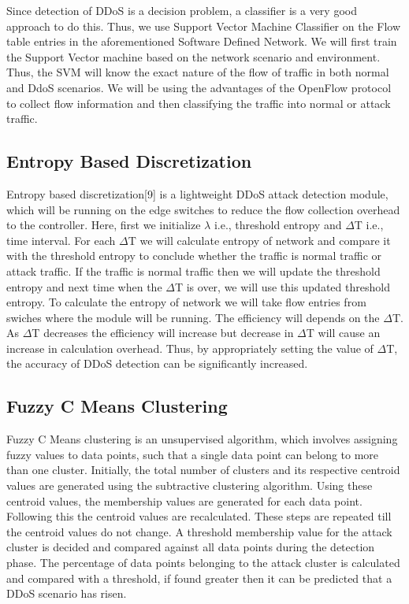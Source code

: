 \documentclass[12pt,a4paper,final]{report}
\begin{document}
Since detection of DDoS is a decision problem, a classifier is a very good approach to do this. Thus, we use Support Vector Machine Classifier on the Flow table entries in the aforementioned Software Defined Network. We will first train the Support Vector machine based on the network scenario and environment. Thus, the SVM will know the exact nature of the flow of traffic in both normal and DdoS scenarios. We will be using the advantages of the OpenFlow protocol to collect flow information and then classifying the traffic into normal or attack traffic.

\subsection{Entropy Based Discretization}
Entropy based discretization[9] is a lightweight DDoS attack detection module, which will be running on the edge switches to reduce the flow collection overhead to the controller. Here, first we initialize $\lambda$ i.e., threshold entropy and $\Delta$T i.e., time interval. For each $\Delta$T we will calculate entropy of network and compare it with the threshold entropy to conclude whether the traffic is normal traffic or attack traffic. If the traffic is normal traffic then we will update the threshold entropy and next time when the $\Delta$T is over, we will use this updated threshold entropy. To calculate the entropy of network we will take flow entries from swiches where the module will be running. The efficiency will depends on the $\Delta$T. As $\Delta$T decreases the efficiency will increase but decrease in $\Delta$T will cause an increase in calculation overhead. Thus, by appropriately setting the value of $\Delta$T, the accuracy of DDoS detection can be significantly increased.

\subsection{Fuzzy C Means Clustering}
Fuzzy C Means clustering is an unsupervised algorithm, which involves assigning fuzzy values to data points, such that a single data point can belong to more than one cluster. Initially, the total number of clusters and its respective centroid values are generated using the subtractive clustering algorithm. Using these centroid values, the membership values are generated for each data point. Following this the centroid values are recalculated. These steps are repeated till the centroid values do not change. A threshold membership value for the attack cluster is decided and compared against all data points during the detection phase. The percentage of data points belonging to the attack cluster is calculated and compared with a threshold, if found greater then it can be predicted that a DDoS scenario has risen.
\newpage
\end{document}
